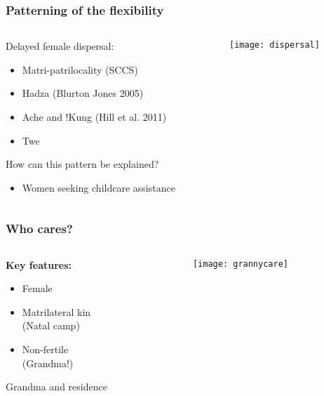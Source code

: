 \documentclass{beamer}
\begin{document}
\begin{frame}
\frametitle{Patterning of the flexibility}

\begin{columns}
\begin{column}{.5\textwidth}
Delayed female dispersal:
	\begin{itemize}
		\item Matri-patrilocality (SCCS)
		\item Hadza (Blurton Jones 2005)
		\item Ache and !Kung (Hill et al. 2011)
		\item Twe
	\end{itemize}
\vspace{0.25cm}
How can this pattern be explained? \\
	\begin{itemize} 
		\item Women seeking childcare assistance
	\end{itemize}
\end{column}

\begin{column}{.5\textwidth}
\texttt{[image: dispersal]}\\
\end{column}
\end{columns}

\end{frame}


\begin{frame}
\frametitle{Who cares?}

\begin{columns}
\begin{column}{.5\textwidth}
\textbf{Key features:}
\begin{itemize}
\item Female
\item Matrilateral kin \\
(Natal camp)
\item Non-fertile \\
(Grandma!)
\end{itemize}
Grandma and residence
\end{column}

\begin{column}{.5\textwidth}
\texttt{[image: grannycare]}\\
\end{column}
\end{columns}

\end{frame}
\end{document}
